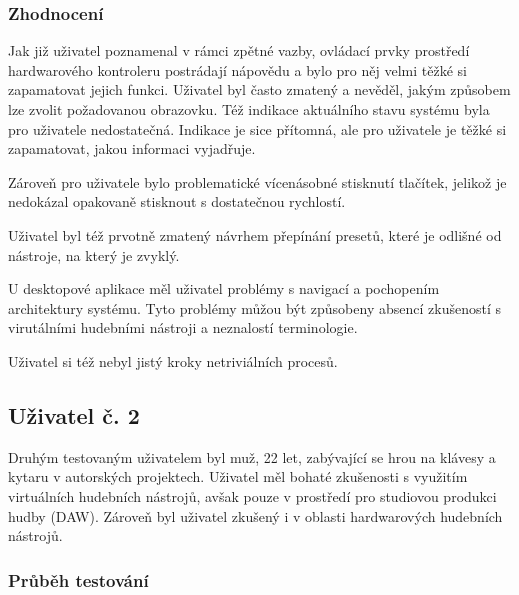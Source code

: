 \documentclass[thesis=M,czech]{FITthesis}[2019/03/06]
\begin{document}
			\subsubsection{Zhodnocení}
				Jak již uživatel poznamenal v rámci zpětné vazby, ovládací prvky prostředí hardwarového kontroleru postrádají nápovědu a bylo pro něj velmi těžké si zapamatovat jejich funkci. Uživatel byl často zmatený a nevěděl, jakým způsobem lze zvolit požadovanou obrazovku. Též indikace aktuálního stavu systému byla pro uživatele nedostatečná. Indikace je sice přítomná, ale pro uživatele je těžké si zapamatovat, jakou informaci vyjadřuje.
				
				Zároveň pro uživatele bylo problematické vícenásobné stisknutí tlačítek, jelikož je nedokázal opakovaně stisknout s dostatečnou rychlostí.
				
				Uživatel byl též prvotně zmatený návrhem přepínání presetů, které je odlišné od nástroje, na který je zvyklý.
				
				U desktopové aplikace měl uživatel problémy s navigací a pochopením architektury systému. Tyto problémy můžou být způsobeny absencí zkušeností s virutálními hudebními nástroji a neznalostí terminologie.
				
				Uživatel si též nebyl jistý kroky netriviálních procesů.

		\subsection{Uživatel č. 2}
			Druhým testovaným uživatelem byl muž, 22 let, zabývající se hrou na klávesy a kytaru v autorských projektech. Uživatel měl bohaté zkušenosti s využitím virtuálních hudebních nástrojů, avšak pouze v prostředí pro studiovou produkci hudby (DAW).
			Zároveň byl uživatel zkušený i v oblasti hardwarových hudebních nástrojů.
			
			\subsubsection{Průběh testování}
	
\end{document}
